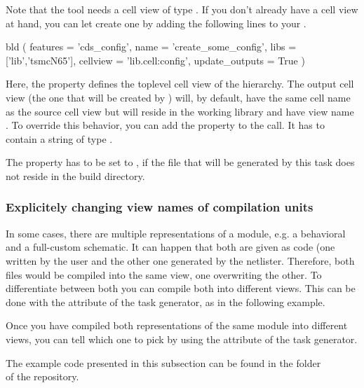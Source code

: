 \warningsign Note that the  tool needs a cell view
of type . If you don't already have a  cell view at hand,
you can let  create one by adding the following lines to your
.
\begin{lstwscript}
bld (                                                                          
    features = 'cds_config',
    name = 'create_some_config',
    libs = ['lib','tsmcN65'],
    cellview = 'lib.cell:config',
    update_outputs = True
)
\end{lstwscript}

Here, the  property defines the toplevel cell view of the
hierarchy. The output cell view (the one that will be created by )
will, by default, have the same cell name as the source cell view but will
reside in the working library and have view name . To
override this behavior, you can add the property  to the
call. It has to contain a string of type .

The  property has to be set to , if the file
that will be generated by this task does not reside in the build directory.

\subsubsection{Explicitely changing view names of compilation units}
In some cases, there are multiple representations of a module, e.g. a
behavioral and a full-custom schematic. It can happen that both are given as
 code (one written by the user and the other one generated by
the netlister. Therefore, both files would be compiled into the same view, one
overwriting the other. To differentiate between both you can compile both into
different views. This can be done with the  attribute of the task
generator, as in the following example.

Once you have compiled both representations of the same module into different
views, you can tell  which one to pick by using the 
attribute of the task generator.

The example code presented in this subsection can be found in the folder\\
 of the repository.

